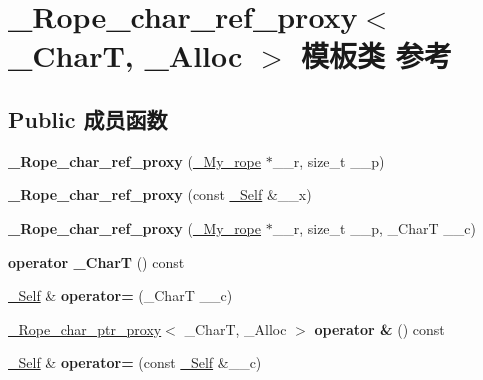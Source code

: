 \hypertarget{class___rope__char__ref__proxy}{}\section{\+\_\+\+Rope\+\_\+char\+\_\+ref\+\_\+proxy$<$ \+\_\+\+CharT, \+\_\+\+Alloc $>$ 模板类 参考}
\label{class___rope__char__ref__proxy}
\subsection*{Public 成员函数}
\begin{DoxyCompactItemize}
\item 
\mbox{\label{class___rope__char__ref__proxy_a03af8d470887913d46d1a3d3c1f320e0}} 
{\bfseries \+\_\+\+Rope\+\_\+char\+\_\+ref\+\_\+proxy} (\hyperlink{classrope}{\+\_\+\+My\+\_\+rope} $\ast$\+\_\+\+\_\+r, size\+\_\+t \+\_\+\+\_\+p)
\item 
\mbox{\label{class___rope__char__ref__proxy_a028bb4acfd8704d74794862e6fdc2c31}} 
{\bfseries \+\_\+\+Rope\+\_\+char\+\_\+ref\+\_\+proxy} (const \hyperlink{class___rope__char__ref__proxy}{\+\_\+\+Self} \&\+\_\+\+\_\+x)
\item 
\mbox{\label{class___rope__char__ref__proxy_aa8db80d5e1bb0dd875561473c4430806}} 
{\bfseries \+\_\+\+Rope\+\_\+char\+\_\+ref\+\_\+proxy} (\hyperlink{classrope}{\+\_\+\+My\+\_\+rope} $\ast$\+\_\+\+\_\+r, size\+\_\+t \+\_\+\+\_\+p, \+\_\+\+CharT \+\_\+\+\_\+c)
\item 
\mbox{\label{class___rope__char__ref__proxy_af9a93984e172a06311d64463b33e2267}} 
{\bfseries operator \+\_\+\+CharT} () const
\item 
\mbox{\label{class___rope__char__ref__proxy_a57703e32c4ae6b16cef2b4df59deb870}} 
\hyperlink{class___rope__char__ref__proxy}{\+\_\+\+Self} \& {\bfseries operator=} (\+\_\+\+CharT \+\_\+\+\_\+c)
\item 
\mbox{\label{class___rope__char__ref__proxy_a1c7b29bf6e9f6cdd4fed675a41af4f22}} 
\hyperlink{class___rope__char__ptr__proxy}{\+\_\+\+Rope\+\_\+char\+\_\+ptr\+\_\+proxy}$<$ \+\_\+\+CharT, \+\_\+\+Alloc $>$ {\bfseries operator \&} () const
\item 
\mbox{\label{class___rope__char__ref__proxy_a29f45e2b7395cff58f329032ce5ecd19}} 
\hyperlink{class___rope__char__ref__proxy}{\+\_\+\+Self} \& {\bfseries operator=} (const \hyperlink{class___rope__char__ref__proxy}{\+\_\+\+Self} \&\+\_\+\+\_\+c)
\end{DoxyCompactItemize}
